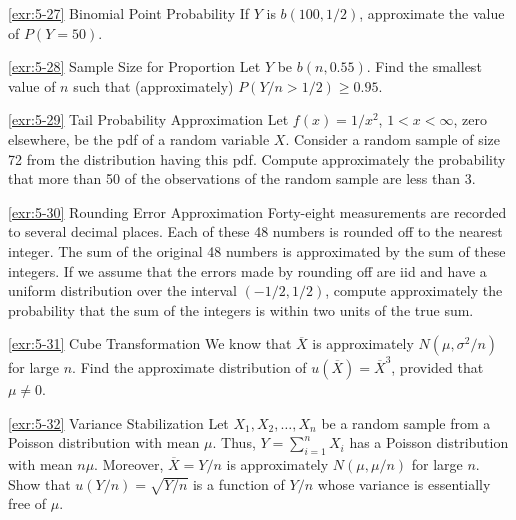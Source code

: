 \begin{exercise}{\ref{exr:5-27} Binomial Point Probability}\label{exr:5-27}
If $Y$ is $b(100, 1/2)$, approximate the value of $P(Y = 50)$.
\end{exercise}

\begin{exercise}{\ref{exr:5-28} Sample Size for Proportion}\label{exr:5-28}
Let $Y$ be $b(n, 0.55)$. Find the smallest value of $n$ such that (approximately) $P(Y/n > 1/2) \geq 0.95$.
\end{exercise}

\begin{exercise}{\ref{exr:5-29} Tail Probability Approximation}\label{exr:5-29}
Let $f(x) = 1/x^2$, $1 < x < \infty$, zero elsewhere, be the pdf of a random variable $X$. Consider a random sample of size 72 from the distribution having this pdf. Compute approximately the probability that more than 50 of the observations of the random sample are less than 3.
\end{exercise}

\begin{exercise}{\ref{exr:5-30} Rounding Error Approximation}\label{exr:5-30}
Forty-eight measurements are recorded to several decimal places. Each of these 48 numbers is rounded off to the nearest integer. The sum of the original 48 numbers is approximated by the sum of these integers. If we assume that the errors made by rounding off are iid and have a uniform distribution over the interval $(-1/2, 1/2)$, compute approximately the probability that the sum of the integers is within two units of the true sum.
\end{exercise}

\begin{exercise}{\ref{exr:5-31} Cube Transformation}\label{exr:5-31}
We know that $\overline{X}$ is approximately $N(\mu, \sigma^2/n)$ for large $n$. Find the approximate distribution of $u(\overline{X}) = \overline{X}^3$, provided that $\mu \neq 0$.
\end{exercise}

\begin{exercise}{\ref{exr:5-32} Variance Stabilization}\label{exr:5-32}
Let $X_1, X_2, \ldots, X_n$ be a random sample from a Poisson distribution with mean $\mu$. Thus, $Y = \sum_{i=1}^n X_i$ has a Poisson distribution with mean $n\mu$. Moreover, $\overline{X} = Y/n$ is approximately $N(\mu, \mu/n)$ for large $n$. Show that $u(Y/n) = \sqrt{Y/n}$ is a function of $Y/n$ whose variance is essentially free of $\mu$.
\end{exercise}

